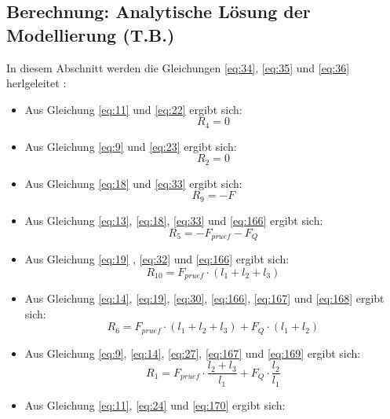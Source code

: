 \subsection{Berechnung: Analytische Lösung der Modellierung (T.B.)}\label{Lösung}
In diesem Abschnitt werden die Gleichungen \ref{eq:34}, \ref{eq:35} und \ref{eq:36} herlgeleitet \cite{item16}\cite{item9}:
\begin{itemize}
	\item Aus Gleichung \ref{eq:11} und \ref{eq:22} ergibt sich:
	\begin{equation}\label{eq:164}
		R_{4}=0
	\end{equation}
	\item Aus Gleichung \ref{eq:9} und \ref{eq:23} ergibt sich:
	\begin{equation}\label{eq:165}
		R_{2}=0
	\end{equation}
	\item Aus Gleichung \ref{eq:18} und \ref{eq:33} ergibt sich:
	\begin{equation}\label{eq:166}
		R_{9}=-F
	\end{equation}
	\item Aus Gleichung \ref{eq:13}, \ref{eq:18}, \ref{eq:33} und \ref{eq:166} ergibt sich:
	\begin{equation}\label{eq:167}
		R_{5}=-F_{pruef}-F_{Q}
	\end{equation}
	\item Aus Gleichung \ref{eq:19} , \ref{eq:32} und \ref{eq:166} ergibt sich:
	\begin{equation}\label{eq:168}
		R_{10}=F_{pruef}\cdot (l_{1}+l_{2}+l_{3})
	\end{equation}
	\item Aus Gleichung \ref{eq:14}, \ref{eq:19}, \ref{eq:30}, \ref{eq:166}, \ref{eq:167} und \ref{eq:168} ergibt sich:
	\begin{equation}\label{eq:169}
		R_{6}=F_{pruef}\cdot (l_{1}+l_{2}+l_{3}) + F_{Q}\cdot (l_{1}+l_{2})
	\end{equation}
	\item Aus Gleichung \ref{eq:9}, \ref{eq:14}, \ref{eq:27}, \ref{eq:167} und \ref{eq:169} ergibt sich:
	\begin{equation}\label{eq:170}
		R_{1}=F_{pruef}\cdot\frac{l_{2}+l_{3}}{l_{1}} + F_{Q}\cdot\frac{l_{2}}{l_{1}}
	\end{equation}
	\item Aus Gleichung \ref{eq:11}, \ref{eq:24} und \ref{eq:170} ergibt sich:
	\begin{equation}\label{eq:171}

\end{equation}
\end{itemize}
